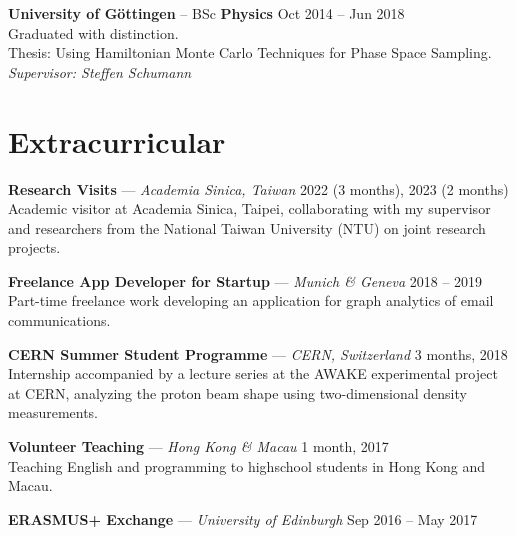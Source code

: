 \documentclass[11pt, letterpaper]{article}
\newcommand{\dateright}[1]{\hfill{\small\color{accentblue} #1}}
\begin{document}
\vspace{0.2cm}

\noindent
\textbf{University of Göttingen} -- BSc \textbf{Physics} \dateright{Oct 2014 -- Jun 2018} \\
Graduated with distinction. \\
Thesis: Using Hamiltonian Monte Carlo Techniques for Phase Space Sampling. \\
\textit{Supervisor: Steffen Schumann}

\section*{Extracurricular}
\noindent
\textbf{Research Visits} — \textit{Academia Sinica, Taiwan} \dateright{2022 (3 months), 2023 (2 months)} \\
Academic visitor at Academia Sinica, Taipei, collaborating with my supervisor and researchers
from the National Taiwan University (NTU) on joint research projects.

\vspace{0.2cm}

\noindent
\textbf{Freelance App Developer for Startup} — \textit{Munich \& Geneva} \dateright{2018 -- 2019} \\
Part-time freelance work developing an
application for graph analytics of email communications.

\vspace{0.2cm}

\noindent
\textbf{CERN Summer Student Programme} — \textit{CERN, Switzerland} \dateright{3 months, 2018} \\
Internship accompanied by a lecture series at the AWAKE experimental project at CERN,
analyzing the proton beam shape using two-dimensional density measurements.

\vspace{0.2cm}

\noindent
\textbf{Volunteer Teaching} — \textit{Hong Kong \& Macau} \dateright{1 month, 2017} \\
Teaching English and programming to highschool students in Hong Kong and Macau.
\vspace{0.2cm}

\noindent
\textbf{ERASMUS+ Exchange} — \textit{University of Edinburgh} \dateright{Sep 2016 -- May 2017}
\end{document}
